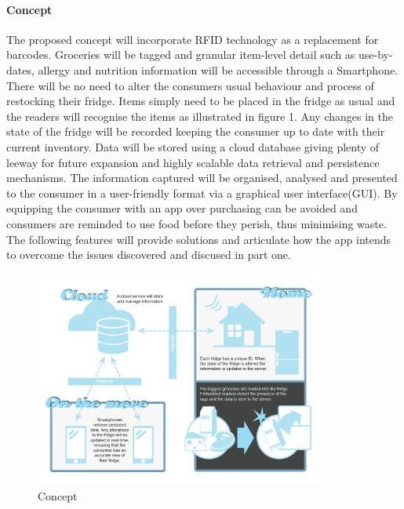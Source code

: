 \documentclass[a4paper, 11pt]{article}
\begin{document}
\paragraph{Concept}The proposed concept will incorporate RFID technology as a replacement for barcodes. Groceries will be tagged and granular item-level detail such as use-by-dates, allergy and nutrition information will be accessible through a Smartphone. There will be no need to alter the consumers usual behaviour and process of restocking their fridge. Items simply need to be placed in the fridge as usual and the readers will recognise the items as illustrated in figure 1. Any changes in the state of the fridge will be recorded keeping the consumer up to date with their current inventory. Data will be stored using a cloud database giving plenty of leeway for future expansion and highly scalable data retrieval and persistence mechanisms. The information captured will be organised, analysed and presented to the consumer in a user-friendly format via a graphical user interface(GUI). By equipping the consumer with an app over purchasing can be avoided and consumers are reminded to use food before they perish, thus minimising waste. The following features will provide solutions and articulate how the app intends to overcome the issues discovered and discused in part one.

\begin{figure}[h!]
  \centering
    \includegraphics[width=0.85\textwidth]{system2.png}
      \caption{Concept}
\end{figure}

\vspace{\baselineskip}
\end{document}

